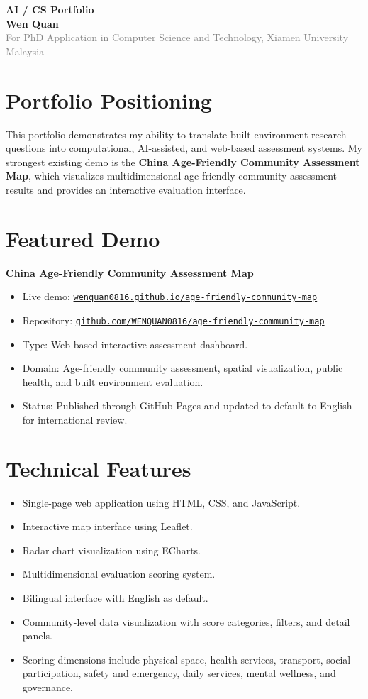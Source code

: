 \documentclass[11pt,a4paper]{article}
\begin{document}
{\LARGE \textbf{AI / CS Portfolio}}\\
\textbf{Wen Quan}\\
\textcolor{gray}{For PhD Application in Computer Science and Technology, Xiamen University Malaysia}

\section*{Portfolio Positioning}
This portfolio demonstrates my ability to translate built environment research questions into computational, AI-assisted, and web-based assessment systems. My strongest existing demo is the \textbf{China Age-Friendly Community Assessment Map}, which visualizes multidimensional age-friendly community assessment results and provides an interactive evaluation interface.

\section*{Featured Demo}
\textbf{China Age-Friendly Community Assessment Map}

\begin{itemize}
  \item Live demo: \href{https://wenquan0816.github.io/age-friendly-community-map/}{\nolinkurl{wenquan0816.github.io/age-friendly-community-map}}
  \item Repository: \href{https://github.com/WENQUAN0816/age-friendly-community-map}{\nolinkurl{github.com/WENQUAN0816/age-friendly-community-map}}
  \item Type: Web-based interactive assessment dashboard.
  \item Domain: Age-friendly community assessment, spatial visualization, public health, and built environment evaluation.
  \item Status: Published through GitHub Pages and updated to default to English for international review.
\end{itemize}

\section*{Technical Features}
\begin{itemize}
  \item Single-page web application using HTML, CSS, and JavaScript.
  \item Interactive map interface using Leaflet.
  \item Radar chart visualization using ECharts.
  \item Multidimensional evaluation scoring system.
  \item Bilingual interface with English as default.
  \item Community-level data visualization with score categories, filters, and detail panels.
  \item Scoring dimensions include physical space, health services, transport, social participation, safety and emergency, daily services, mental wellness, and governance.
\end{itemize}
\end{document}
